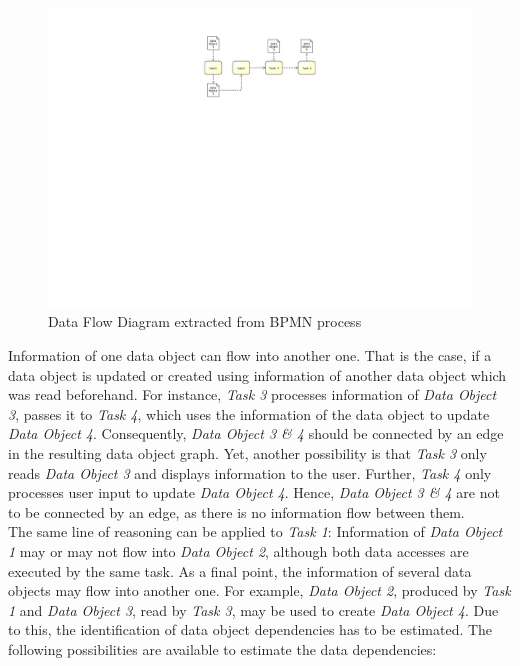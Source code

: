 \begin{figure}[h!]
	\centering
	\includegraphics[width=12cm, trim={10cm 14.5cm 10cm 2.5cm}]{img/DataFlowExample.pdf}
	\caption{Data Flow Diagram extracted from BPMN process}
	\label{fig:dataFlowExample}
\end{figure}

\noindent
Information of one data object can flow into another one. That is the case, if a data object is updated or created using information of another data object which was read beforehand. 
For instance, \textit{Task 3} processes information of \textit{Data Object 3}, passes it to \textit{Task 4}, which uses the information of the data object to update \textit{Data Object 4}. Consequently, \textit{Data Object 3 \& 4} should be connected by an edge in the resulting data object graph. Yet, another possibility is that \textit{Task 3} only reads \textit{Data Object 3} and displays information to the user. Further, \textit{Task 4} only processes user input to update \textit{Data Object 4}. Hence, \textit{Data Object 3 \& 4} are not to be connected by an edge, as there is no information flow between them. \\
The same line of reasoning can be applied to \textit{Task 1}: Information of \textit{Data Object 1} may or may not flow into \textit{Data Object 2}, although both data accesses are executed by the same task. As a final point, the information of several data objects may flow into another one. For example, \textit{Data Object 2}, produced by \textit{Task 1} and \textit{Data Object 3}, read by \textit{Task 3}, may be used to create \textit{Data Object 4}. Due to this, the identification of data object dependencies has to be estimated. The following possibilities are available to estimate the data dependencies:



